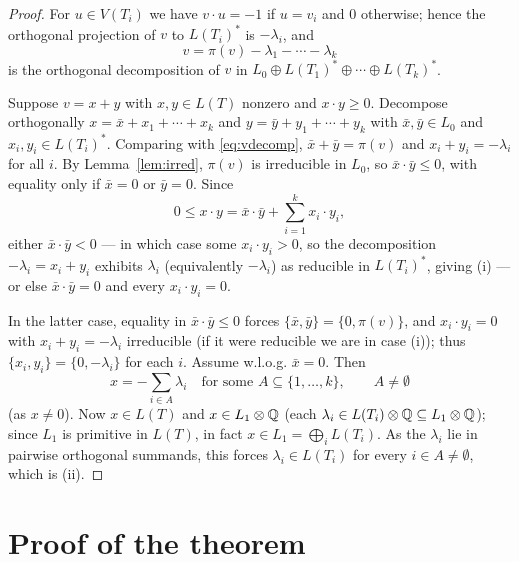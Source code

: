 \begin{proof}
For $u\in V(T_i)$ we have $v\cdot u=-1$ if $u=v_i$ and $0$ otherwise; hence the orthogonal
projection of $v$ to $L(T_i)^\ast$ is $-\lambda_i$, and
\begin{equation}
\label{eq:vdecomp}
v=\pi(v)-\lambda_1-\cdots-\lambda_k
\end{equation}
is the orthogonal decomposition of $v$ in $L_0\oplus L(T_1)^\ast\oplus\cdots\oplus
L(T_k)^\ast$.

Suppose $v=x+y$ with $x,y\in L(T)$ nonzero and $x\cdot y\ge0$.  Decompose orthogonally
$x=\bar x+x_1+\cdots+x_k$ and $y=\bar y+y_1+\cdots+y_k$ with $\bar x,\bar y\in L_0$ and
$x_i,y_i\in L(T_i)^\ast$.  Comparing with \eqref{eq:vdecomp}, $\bar x+\bar y=\pi(v)$ and
$x_i+y_i=-\lambda_i$ for all $i$.  By Lemma~\ref{lem:irred}, $\pi(v)$ is irreducible in
$L_0$, so $\bar x\cdot\bar y\le0$, with equality only if $\bar x=0$ or $\bar y=0$.  Since
\[
0\le x\cdot y=\bar x\cdot\bar y+\sum_{i=1}^k x_i\cdot y_i,
\]
either $\bar x\cdot\bar y<0$ — in which case some $x_i\cdot y_i>0$, so the decomposition
$-\lambda_i=x_i+y_i$ exhibits $\lambda_i$ (equivalently $-\lambda_i$) as reducible in
$L(T_i)^\ast$, giving (i) — or else $\bar x\cdot\bar y=0$ and every $x_i\cdot y_i=0$.

In the latter case, equality in $\bar x\cdot\bar y\le0$ forces $\{\bar x,\bar
y\}=\{0,\pi(v)\}$, and $x_i\cdot y_i=0$ with $x_i+y_i=-\lambda_i$ irreducible (if it were
reducible we are in case (i)); thus $\{x_i,y_i\}=\{0,-\lambda_i\}$ for each $i$.  Assume
w.l.o.g. $\bar x=0$.  Then
\[
x=-\sum_{i\in A}\lambda_i\quad\text{for some }A\subseteq\{1,\dots,k\},\qquad A\ne\emptyset
\]
(as $x\ne0$).  Now $x\in L(T)$ and $x\in L_1\otimes\mathbb{Q}$ (each $\lambda_i\in L(T_i)\otimes\mathbb{Q}
\subseteq L_1\otimes\mathbb{Q}$); since $L_1$ is primitive in $L(T)$, in fact $x\in L_1=
\bigoplus_iL(T_i)$.  As the $\lambda_i$ lie in pairwise orthogonal summands, this forces
$\lambda_i\in L(T_i)$ for every $i\in A\ne\emptyset$, which is (ii).
\end{proof}

\section{Proof of the theorem}
\label{sec:finale}

